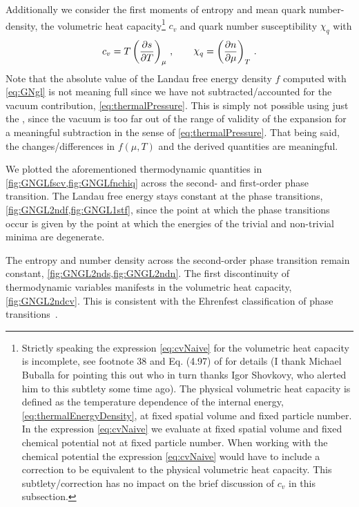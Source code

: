Additionally we consider the first moments of entropy and mean quark number-density, \viz{} the volumetric heat capacity\footnote{%
	Strictly speaking the expression \eqref{eq:cvNaive} for the volumetric heat capacity is incomplete, see footnote 38 and Eq. (4.97) of  for details (I thank Michael Buballa for pointing this out \dash{} who in turn thanks Igor Shovkovy, who alerted him to this subtlety some time ago). 
	The physical volumetric heat capacity is defined as the temperature dependence of the internal energy, \cf{} \cref{eq:thermalEnergyDensity}, at fixed spatial volume and fixed particle number.
	In the expression \eqref{eq:cvNaive} we evaluate at fixed spatial volume and fixed chemical potential \dash{} not at fixed particle number.
	When working with the chemical potential the expression \eqref{eq:cvNaive} would have to include a correction  to be equivalent to the physical volumetric heat capacity.
	This subtlety/correction has no impact on the brief discussion of $c_v$ in this subsection.} $c_v$ and quark number susceptibility $\chi_q$ with
\begin{align}
	c_v= T \del{\frac{\partial s}{\partial T}}_\mu\, ,\qquad \chi_q = \del{\frac{\partial n}{\partial \mu}}_T\, .\label{eq:cvNaive}
\end{align}
Note that the absolute value of the Landau free energy density $f$ computed with \cref{eq:GNgl} is not meaning full since we have not subtracted/accounted for the vacuum contribution, \cf{} \cref{eq:thermalPressure}.
This is simply not possible using just the \gle{}, since the vacuum is too far out of the range of validity of the expansion for a meaningful subtraction in the sense of \cref{eq:thermalPressure}.
That being said, the changes/differences in $f(\mu,T)$ and the derived quantities are meaningful. 

We plotted the aforementioned thermodynamic quantities in \cref{fig:GNGLfscv,fig:GNGLfnchiq} across the second- and first-order phase transition.
The Landau free energy stays constant at the phase transitions, \cf{} \cref{fig:GNGL2ndf,fig:GNGL1stf}, since the point at which the phase transitions occur is given by the point at which the energies of the trivial and non-trivial minima are degenerate.

The entropy and number density across the second-order phase transition remain constant, \cf{} \cref{fig:GNGL2nds,fig:GNGL2ndn}.
The first discontinuity of thermodynamic variables manifests in the volumetric heat capacity, \cf{} \cref{fig:GNGL2ndcv}.
This is consistent with the Ehrenfest classification of phase transitions~\cite{Ehrenfest1933}.


